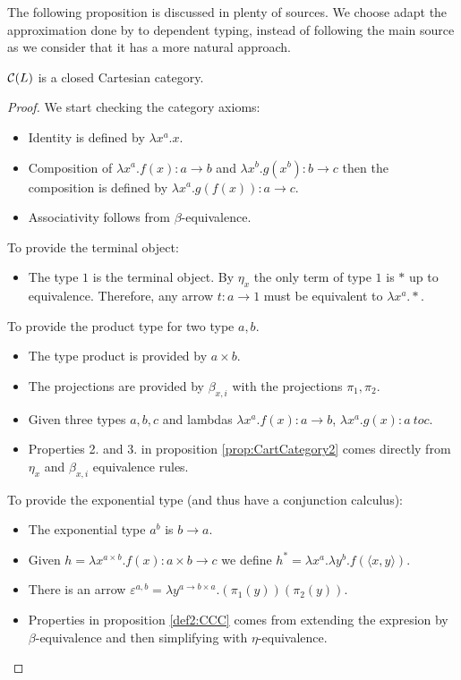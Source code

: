 The following proposition is discussed in plenty of sources. We choose adapt the approximation done by \cite{seely1984locally} to dependent typing, instead of following the main source \cite{lambek1985cartesian} as we consider that it has a more natural approach.
\begin{proposition}
  $\mathcal{C} (L)$ is a closed Cartesian  category. 
\end{proposition}
\begin{proof}
  We start checking the category axioms:
  \begin{itemize}
  \item Identity is defined by $\lambda x^a.x$.
  \item Composition of $\lambda x^a. f(x):  a\to b$ and $\lambda x^b. g(x^b): b \to c$ then the composition is defined by $\lambda x^a. g(f(x)): a \to c$.
  \item Associativity follows from $\beta$-equivalence.\\
  \end{itemize}
  To provide the terminal object:
  \begin{itemize}
  \item The type $1$ is the terminal object. By $\eta_x$ the only term of type $1$ is $*$ up to equivalence. Therefore, any arrow $t:a \to 1$ must be equivalent to $\lambda x^a. *$.\\
  \end{itemize}
  To provide the product type for two type $a,b$.
  \begin{itemize}
  \item The type product is provided by $a \times b$.
  \item The projections are provided by $\beta_{x,i}$ with the projections $\pi_1,\pi_2$.
  \item Given three types $a,b,c$ and lambdas $\lambda x^a. f(x) : a\to b$, $\lambda x^a. g(x) : a\ to c$.
  \item Properties 2. and 3. in proposition \ref{prop:CartCategory2} comes directly from $\eta_x$ and $\beta_{x,i}$ equivalence rules.\\
  \end{itemize}
  To provide the exponential type (and thus have a conjunction calculus):
  \begin{itemize}
  \item The exponential type $a^b$ is $b\to a$.
  \item Given $h = \lambda x^{a\times b}. f(x): a\times b \to c$  we define $h^* = \lambda x^a. \lambda y^b. f(\langle x,y\rangle)$.
  \item There is an arrow $\varepsilon^{a,b} = \lambda y^{a\to b \times a}. (\pi_1(y))(\pi_2(y))$.
  \item Properties in proposition \ref{def2:CCC} comes from extending the expresion by $\beta$-equivalence and then simplifying with $\eta$-equivalence.
  \end{itemize}
\end{proof}

